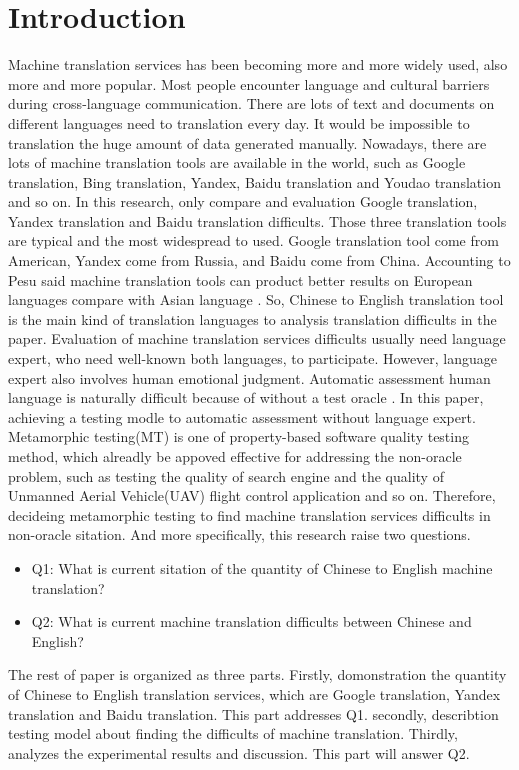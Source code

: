 \documentclass[conference]{IEEEtran}
\begin{document}
\section{Introduction}
Machine translation services has been becoming more and more widely used, also
more and more popular. Most people encounter language and cultural barriers
during cross-language communication. There are lots of text and documents on different languages need
to translation every day. It would be impossible to translation the huge amount
of data generated manually. Nowadays, there are lots of machine translation
tools are available in the world, such as Google translation, Bing translation,
Yandex, Baidu translation and Youdao translation and so on. In this research,
only compare and evaluation Google translation, Yandex translation and Baidu
translation difficults. Those three translation tools are typical and the most
widespread to used. Google translation tool come from American, Yandex come from
Russia, and Baidu come from China. Accounting to Pesu said machine translation
tools can product better results on European languages compare with Asian
language \cite{pesu2018monte}. So, Chinese to English translation tool is the main
kind of translation languages to analysis translation difficults in the paper.
Evaluation of machine translation services difficults usually need language
expert, who need well-known both languages, to participate. However, language
expert also involves human emotional judgment. Automatic assessment human
language is naturally difficult because of without a test oracle \cite{zhou2016metamorphic}.
In this paper, achieving a testing modle to automatic assessment
without language expert.
Metamorphic testing(MT) is one of property-based software quality testing
method, which alreadly be appoved effective for addressing the non-oracle
problem, such as testing the quality of search engine and the quality of
Unmanned Aerial Vehicle(UAV) flight control application and so on.
Therefore, decideing metamorphic testing to find machine translation services
difficults in non-oracle sitation.
And more specifically, this research raise two questions.
\begin{itemize}
  \item Q1: What is current sitation of the quantity of Chinese to English
    machine translation?
  \item Q2: What is current machine translation difficults between Chinese and English?
\end{itemize}

The rest of paper is organized as three parts. Firstly, domonstration the
quantity of Chinese to English translation services, which are Google
translation, Yandex translation and Baidu translation. This part addresses Q1.
secondly, describtion testing model about finding the difficults of machine
translation.
Thirdly, analyzes the experimental results and discussion. This part will
answer Q2.
\end{document}
